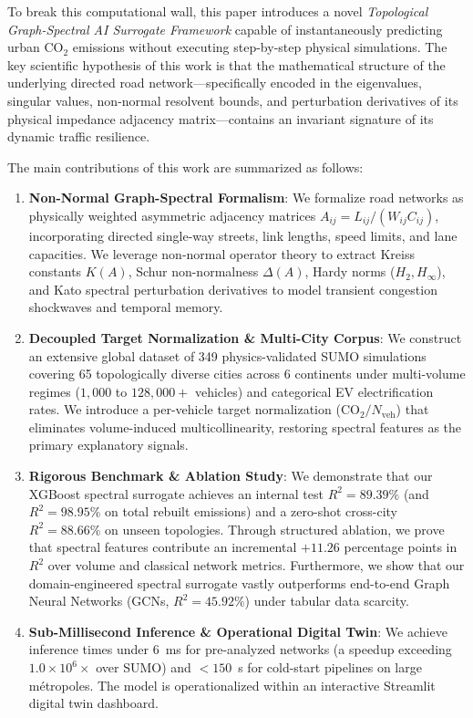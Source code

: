 \documentclass[lettersize,journal]{IEEEtran}
\begin{document}
To break this computational wall, this paper introduces a novel \emph{Topological Graph-Spectral AI Surrogate Framework} capable of instantaneously predicting urban $\text{CO}_2$ emissions without executing step-by-step physical simulations. The key scientific hypothesis of this work is that the mathematical structure of the underlying directed road network—specifically encoded in the eigenvalues, singular values, non-normal resolvent bounds, and perturbation derivatives of its physical impedance adjacency matrix—contains an invariant signature of its dynamic traffic resilience.

The main contributions of this work are summarized as follows:
\begin{enumerate}
    \item \textbf{Non-Normal Graph-Spectral Formalism}: We formalize road networks as physically weighted asymmetric adjacency matrices $A_{ij} = L_{ij}/(W_{ij} C_{ij})$, incorporating directed single-way streets, link lengths, speed limits, and lane capacities. We leverage non-normal operator theory to extract Kreiss constants $K(A)$, Schur non-normalness $\Delta(A)$, Hardy norms ($H_2, H_\infty$), and Kato spectral perturbation derivatives to model transient congestion shockwaves and temporal memory.
    \item \textbf{Decoupled Target Normalization \& Multi-City Corpus}: We construct an extensive global dataset of 349 physics-validated SUMO simulations covering 65 topologically diverse cities across 6 continents under multi-volume regimes ($1,000$ to $128,000+$ vehicles) and categorical EV electrification rates. We introduce a per-vehicle target normalization ($\text{CO}_2 / N_{\text{veh}}$) that eliminates volume-induced multicollinearity, restoring spectral features as the primary explanatory signals.
    \item \textbf{Rigorous Benchmark \& Ablation Study}: We demonstrate that our XGBoost spectral surrogate achieves an internal test $R^2 = 89.39\%$ (and $R^2 = 98.95\%$ on total rebuilt emissions) and a zero-shot cross-city $R^2 = 88.66\%$ on unseen topologies. Through structured ablation, we prove that spectral features contribute an incremental $+11.26$ percentage points in $R^2$ over volume and classical network metrics. Furthermore, we show that our domain-engineered spectral surrogate vastly outperforms end-to-end Graph Neural Networks (GCNs, $R^2 = 45.92\%$) under tabular data scarcity.
    \item \textbf{Sub-Millisecond Inference \& Operational Digital Twin}: We achieve inference times under $6$~ms for pre-analyzed networks (a speedup exceeding $1.0 \times 10^6 \times$ over SUMO) and $<150$~s for cold-start pipelines on large métropoles. The model is operationalized within an interactive Streamlit digital twin dashboard.
\end{enumerate}
\end{document}
